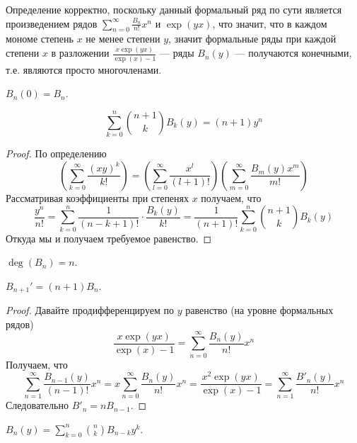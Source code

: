 \documentclass[12pt,a4paper]{article}
\begin{document}
    \begin{remark*}
        Определение корректно, поскольку данный формальный ряд по сути является произведением рядов $\sum_{n=0}^\infty \frac{B_n}{n!} x^n$ и $\exp(yx)$, что значит, что в каждом мономе степень $x$ не менее степени $y$, значит формальные ряды при каждой степени $x$ в разложении $\frac{x \exp(yx)}{\exp(x) - 1}$ --- ряды $B_n(y)$ --- получаются конечными, т.е. являются просто многочленами.
    \end{remark*}

    \begin{corollary}
        $B_n(0) = B_n$.
    \end{corollary}

    \begin{lemma}
        \[\sum_{k=0}^n \binom{n+1}{k} B_k(y) = (n+1) y^n\]
    \end{lemma}

    \begin{proof}
        По определению
        \[\left(\sum_{k=0}^\infty \frac{(xy)^k}{k!}\right) = \left(\sum_{l=0}^\infty \frac{x^l}{(l+1)!}\right) \left(\sum_{m=0}^\infty \frac{B_m(y) x^m}{m!}\right)\]
        Рассматривая коэффициенты при степенях $x$ получаем, что
        \[\frac{y^n}{n!} = \sum_{k=0}^n \frac{1}{(n-k+1)!} \cdot \frac{B_k(y)}{k!} = \frac{1}{(n+1)!} \sum_{k=0}^n \binom{n+1}{k} B_k(y)\]
        Откуда мы и получаем требуемое равенство.
    \end{proof}

    \begin{corollary}
        $\deg(B_n) = n$.
    \end{corollary}

    \begin{lemma}
        $B_{n+1}' = (n+1) B_{n}$.
    \end{lemma}

    \begin{proof}
        Давайте продифференцируем по $y$ равенство (на уровне формальных рядов)
        \[\frac{x \exp(yx)}{\exp(x) - 1} = \sum_{n=0}^\infty \frac{B_n(y)}{n!} x^n\]
        Получаем, что
        \[\sum_{n=1}^\infty \frac{B_{n-1}(y)}{(n-1)!} x^n = x \sum_{n=0}^\infty \frac{B_n(y)}{n!} x^n = \frac{x^2 \exp(yx)}{\exp(x) - 1} = \sum_{n=1}^\infty \frac{B'_n(y)}{n!} x^n\]
        Следовательно $B'_n = n B_{n-1}$.
    \end{proof}

    \begin{corollary}
        $B_n(y) = \sum_{k=0}^n \binom{n}{k} B_{n-k} y^k$.
    \end{corollary}
\end{document}
